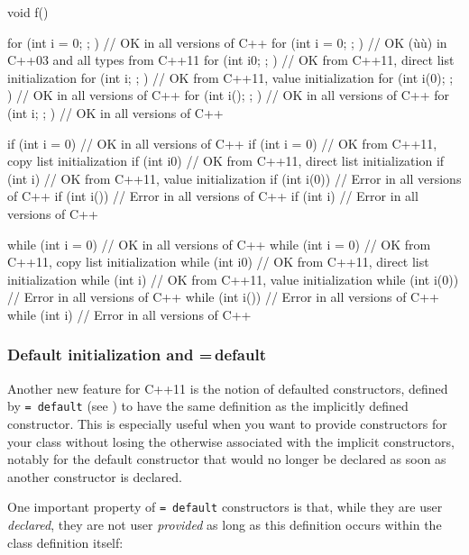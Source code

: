 \begin{emcppslisting}
void f()
{
   for (int i = 0; ; ) {}    // OK in all versions of C++
   for (int i = {0}; ; ) {}  // OK (ù{}ù) in C++03 and all types from C++11
   for (int i{0}; ; ) {}     // OK from C++11, direct list initialization
   for (int i{}; ; ) {}      // OK from C++11, value initialization
   for (int i(0); ; ) {}     // OK in all versions of C++
   for (int i(); ; ) {}      // OK in all versions of C++
   for (int i; ; ) {}        // OK in all versions of C++

   if (int i = 0) {}    // OK in all versions of C++
   if (int i = {0}) {}  // OK from C++11, copy list initialization
   if (int i{0}) {}     // OK from C++11, direct list initialization
   if (int i{}) {}      // OK from C++11, value initialization
   if (int i(0)) {}     // Error in all versions of C++
   if (int i()) {}      // Error in all versions of C++
   if (int i) {}        // Error in all versions of C++

   while (int i = 0) {}    // OK in all versions of C++
   while (int i = {0}) {}  // OK from C++11, copy list initialization
   while (int i{0}) {}     // OK from C++11, direct list initialization
   while (int i{}) {}      // OK from C++11, value initialization
   while (int i(0)) {}     // Error in all versions of C++
   while (int i()) {}      // Error in all versions of C++
   while (int i) {}        // Error in all versions of C++
}
\end{emcppslisting}
    

\subsubsection[Default initialization and \lstinline!=!\,\lstinline!default!]{Default initialization and {\SubsubsecCode =}\,{\SubsubsecCode default}}\label{default-initialization-and-=-default}

Another new feature for C++11 is the notion of defaulted constructors,
defined by \lstinline!=!~\lstinline!default! (see ) to have
the same definition as the implicitly defined constructor. This is
especially useful when you want to provide constructors for your class
without losing the  otherwise associated with the
implicit constructors, notably for the default constructor that would no
longer be declared as soon as another constructor is declared.

One important property of \lstinline!=!~\lstinline!default! constructors is
that, while they are user \emph{declared}, they are not user
\emph{provided} as long as this definition occurs within the class
definition itself:

